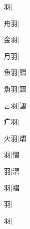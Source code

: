\begin{multicols}{2}
{{羽}\mktsJzrVerticalBar{}{\cjk{}{\cnsym{}　}{\cnsym{}　}{\cnsym{}　}}|{}\par
{\cjk{}{\cnsym{}　}舟羽}\mktsJzrVerticalBar{}{\cjk{}{\cnsym{}　}{\cnsym{}　}{\cnsym{}　}}|{}\par
{\cjk{}{\cnsym{}　}金羽}\mktsJzrVerticalBar{}{\cjk{}{\cnsym{}　}{\cnsym{}　}{\cnsym{}　}}|{}\par
{\cjk{}{\cnsym{}　}月羽}\mktsJzrVerticalBar{}{\cjk{}{\cnsym{}　}{\cnsym{}　}{\cnsym{}　}}|{}\par
{\cjk{}{\cnsym{}　}鱼羽}\mktsJzrVerticalBar{}{\cjk{}{\cnsym{}　}{\cnsym{}　}{\cnsym{}　}}|{\cjk{}鳛}\par
{\cjk{}{\cnsym{}　}魚羽}\mktsJzrVerticalBar{}{\cjk{}{\cnsym{}　}{\cnsym{}　}{\cnsym{}　}}|{\cjk{}鰼}\par
{\cjk{}{\cnsym{}　}言羽}\mktsJzrVerticalBar{}{\cjk{}{\cnsym{}　}{\cnsym{}　}{\cnsym{}　}}|{\cjk{}謵}\par
{\cjk{}{\cnsym{}　}疒羽}\mktsJzrVerticalBar{}{\cjk{}{\cnsym{}　}{\cnsym{}　}{\cnsym{}　}}|{}\par
{\cjk{}{\cnsym{}　}火羽}\mktsJzrVerticalBar{}{\cjk{}{\cnsym{}　}{\cnsym{}　}{\cnsym{}　}}|{\cjk{}熠}\par
{羽}\mktsJzrVerticalBar{}{\cjk{}{\cnsym{}　}{\cnsym{}　}{\cnsym{}　}}|{\cjk{}慴}\par
{羽}\mktsJzrVerticalBar{}{\cjk{}{\cnsym{}　}{\cnsym{}　}{\cnsym{}　}}|{\cjk{}漝}\par
{羽}\mktsJzrVerticalBar{}{\cjk{}{\cnsym{}　}{\cnsym{}　}{\cnsym{}　}}|{\cjk{}褶}\par
{羽}\mktsJzrVerticalBar{}{\cjk{}{\cnsym{}　}{\cnsym{}　}{\cnsym{}　}}|{}\par
{羽}\mktsJzrVerticalBar{}{\cjk{}{\cnsym{}　}{\cnsym{}　}{\cnsym{}　}}|{}\par
}
\end{multicols}
